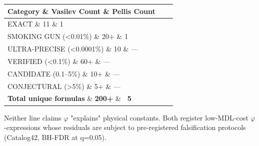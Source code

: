 \begin{tabular}{|l|l|l|}
\hline
Category \& Vasilev Count \& Pellis Count \\
\hline
EXACT \& 11 \& 1 \\
SMOKING GUN (<0.01\%) \& 20+ \& 1 \\
ULTRA-PRECISE (<0.0001\%) \& 10 \& --- \\
VERIFIED (<0.1\%) \& 60+ \& --- \\
CANDIDATE (0.1--5\%) \& 10+ \& --- \\
CONJECTURAL (>5\%) \& 5+ \& --- \\
\textbf{Total unique formulas} \& \textbf{200+} \& \textbf{~5} \\
\hline
\end{tabular}
Neither line claims $\varphi$ "explains" physical constants. Both register low-MDL-cost $\varphi$-expressions whose residuals are subject to pre-registered falsification protocols (Catalog42, BH-FDR at q=0.05).

